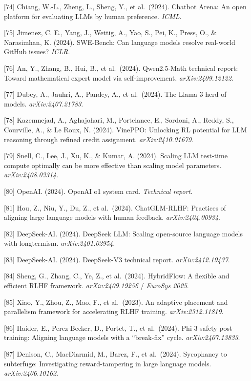 {[}74{]} Chiang, W.-L., Zheng, L., Sheng, Y., et al.~(2024). Chatbot Arena: An open platform for evaluating LLMs by human preference. \emph{ICML}.

{[}75{]} Jimenez, C. E., Yang, J., Wettig, A., Yao, S., Pei, K., Press, O., \& Narasimhan, K. (2024). SWE-Bench: Can language models resolve real-world GitHub issues? \emph{ICLR}.

{[}76{]} An, Y., Zhang, B., Hui, B., et al.~(2024). Qwen2.5-Math technical report: Toward mathematical expert model via self-improvement. \emph{arXiv:2409.12122}.

{[}77{]} Dubey, A., Jauhri, A., Pandey, A., et al.~(2024). The Llama 3 herd of models. \emph{arXiv:2407.21783}.

{[}78{]} Kazemnejad, A., Aghajohari, M., Portelance, E., Sordoni, A., Reddy, S., Courville, A., \& Le Roux, N. (2024). VinePPO: Unlocking RL potential for LLM reasoning through refined credit assignment. \emph{arXiv:2410.01679}.

{[}79{]} Snell, C., Lee, J., Xu, K., \& Kumar, A. (2024). Scaling LLM test-time compute optimally can be more effective than scaling model parameters. \emph{arXiv:2408.03314}.

{[}80{]} OpenAI. (2024). OpenAI o1 system card. \emph{Technical report}.

{[}81{]} Hou, Z., Niu, Y., Du, Z., et al.~(2024). ChatGLM-RLHF: Practices of aligning large language models with human feedback. \emph{arXiv:2404.00934}.

{[}82{]} DeepSeek-AI. (2024). DeepSeek LLM: Scaling open-source language models with longtermism. \emph{arXiv:2401.02954}.

{[}83{]} DeepSeek-AI. (2024). DeepSeek-V3 technical report. \emph{arXiv:2412.19437}.

{[}84{]} Sheng, G., Zhang, C., Ye, Z., et al.~(2024). HybridFlow: A flexible and efficient RLHF framework. \emph{arXiv:2409.19256} / \emph{EuroSys 2025}.

{[}85{]} Xiao, Y., Zhou, Z., Mao, F., et al.~(2023). An adaptive placement and parallelism framework for accelerating RLHF training. \emph{arXiv:2312.11819}.

{[}86{]} Haider, E., Perez-Becker, D., Portet, T., et al.~(2024). Phi-3 safety post-training: Aligning language models with a ``break-fix'' cycle. \emph{arXiv:2407.13833}.

{[}87{]} Denison, C., MacDiarmid, M., Barez, F., et al.~(2024). Sycophancy to subterfuge: Investigating reward-tampering in large language models. \emph{arXiv:2406.10162}.

